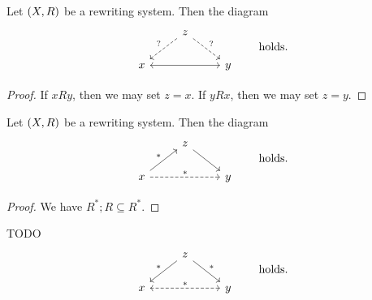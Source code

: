 \begin{lemma} \label{triangelRSdiagrams}
Let $\left( X,R \right)$ be a rewriting system. Then the diagram
\[ \begin{tikzcd}
{} & \arrow[dl, dashed, swap, "{?}"] z \arrow[dr, dashed, "{?}"] & {} \\
x \arrow[rr, leftrightarrow] & {} & y
\end{tikzcd} \qquad\text{holds.} \]
\end{lemma}
\begin{proof}
If $xRy$, then we may set $z = x$. If $yRx$, then we may set $z = y$.
\end{proof}

\begin{lemma} \label{transitiveClosureRSdiagram}
Let $\left( X,R \right)$ be a rewriting system. Then the diagram
\[ \begin{tikzcd}
{} & z \arrow[dr] & {} \\
x \arrow[ur, "{*}"] \arrow[rr, dashed, "{*}"] & {} & y
\end{tikzcd} \qquad\text{holds.} \]
\end{lemma}
\begin{proof}
We have $R^*;R \subseteq R^*$.
\end{proof}


TODO
\[ \begin{tikzcd}
{} & \arrow[dl, swap, "{*}"] z \arrow[dr, "{*}"] & {} \\
x \arrow[rr, dashed, leftrightarrow, "{*}"] & {} & y
\end{tikzcd} \qquad\text{holds.} \]


